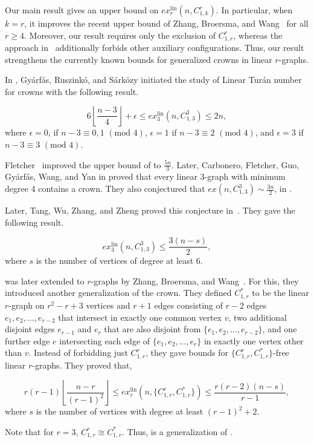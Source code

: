 \documentclass[12pt]{article}
\begin{document}
Our main result gives an upper bound on $ex_r^{\mathrm{lin}}(n,C_{1,k}^r)$. In particular, when $k=r$, it improves the recent upper bound of Zhang, Broersma, and Wang~\cite{zhang2025generalized} for all $r \geq 4$. Moreover, our result requires only the exclusion of $C_{1,r}^r$, whereas the approach in~\cite{zhang2025generalized} additionally forbids other auxiliary configurations. Thus, our result strengthens the currently known bounds for generalized crowns in linear $r$-graphs.

In \cite{gyarfas2022linear}, Gy\'arf\'as, Ruszink\'o, and S\'ark\"ozy initiated the study of Linear Tur\'{a}n number for crowns with the following result.
\begin{theorem}\label{thm1} $$6\left\lfloor\frac{n-3}{4}\right\rfloor + \epsilon \leq ex_3^{\mathrm{lin}}(n,C^3_{1,3}) \leq 2n,$$ where $\epsilon =0$, if $n-3 \equiv 0,1$ $(\text{mod } 4)$, $\epsilon =1$ if $n-3 \equiv 2$ $(\text{mod } 4)$, and $\epsilon =3$ if $n-3 \equiv 3$ $(\text{mod } 4)$.
    
\end{theorem}
Fletcher~\cite{fletcher2021improved} improved the upper bound of  to $\frac{5n}{3}$. Later, Carbonero, Fletcher, Guo, Gy\'arf\'as, Wang, and Yan in \cite{carbonero2022crowns} proved that every linear $3$-graph with minimum degree $4$ contains a crown. They also conjectured that $ex(n,C^3_{1,3}) \sim \frac{3n}{2}$, in \cite{carbonero2021crowns}.

Later, Tang, Wu, Zhang, and Zheng proved this conjecture in~\cite{tang2022turan}. They gave the following result.
\begin{theorem}\label{thm2}
$$ex_3^{\mathrm{lin}}(n,C^3_{1,3}) \leq \frac{3(n-s)}{2},$$ where $s$ is the number of vertices of degree at least $6$.
\end{theorem}
 was later extended to $r$-graphs by Zhang, Broersma, and Wang~\cite{zhang2025generalized}. For this, they introduced another generalization of the crown. They defined $C_{1,r}^*$ to be the linear $r$-graph on $r^2-r+3$ vertices and $r+1$ edges consisting of $r-2$ edges $e_1,e_2,\dots,e_{r-2}$ that intersect in exactly one common vertex $v$, two additional disjoint edges $e_{r-1}$ and $e_r$ that are also disjoint from $\{e_1,e_2,\dots,e_{r-2}\}$, and one further edge $e$ intersecting each edge of $\{e_1,e_2,\dots,e_r\}$ in exactly one vertex other than $v$. Instead of forbidding just $C^r_{1,r}$, they gave bounds for $\{C^r_{1,r},C^*_{1,r}\}$-free linear $r$-graphs. They proved that,
\begin{theorem}\label{thm3}
$$r(r-1)\left\lfloor \frac{n-r}{(r-1)^2} \right\rfloor
\le ex_r^{\mathrm{lin}}(n, \{C^r_{1,r},C^*_{1,r}\}) \le
\frac{r(r-2)(n-s)}{r-1},$$
    where $s$ is the number of vertices with degree at least $(r-1)^2+2$.
\end{theorem}
Note that for $r =3$, $C_{1,r}^r\cong C^*_{1,r}$. Thus,  is a generalization of .
\end{document}

